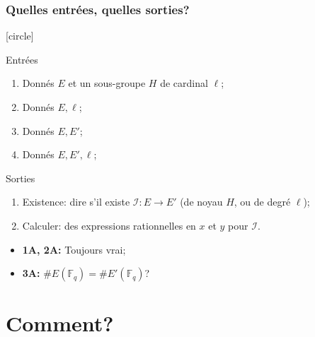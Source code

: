 \documentclass[10pt]{beamer}
\newcommand{\card}[1]{\# #1}  %
\newcommand{\F}{\mathbb{F}}  %
\newcommand{\0}{\mathcal{O}}  %
\newcommand{\isog}[1]{\mathcal{#1}}  %
\newcommand{\I}{\isog{I}}  %
\begin{document}
\begin{frame}
  \frametitle{Quelles entrées, quelles sorties?}

  [circle]
  \begin{block}{Entrées}
    \begin{enumerate}
    \item Donnés $E$ et un sous-groupe $H$ de cardinal $\ell$;
    \item Donnés $E, \ell$;
    \item Donnés $E, E'$;
    \item Donnés $E, E', \ell$;
    \end{enumerate}
  \end{block}

  \begin{block}{Sorties}
    \renewcommand{\insertenumlabel}{\Alph{enumi}}
    \begin{enumerate}
    \item Existence: dire s'il existe $\I:E\to E'$ (de noyau $H$, ou de degré $\ell$);
    \item Calculer: des expressions rationnelles en $x$ et $y$ pour $\I$.
    \end{enumerate}
  \end{block}

  \begin{itemize}
  \item \textbf{1A, 2A:} Toujours vrai;
  \item \textbf{3A:} $\card{E(\F_q)} = \card{E'(\F_q)}$?
  \end{itemize}
\end{frame}


\section{Comment?}

\end{document}
